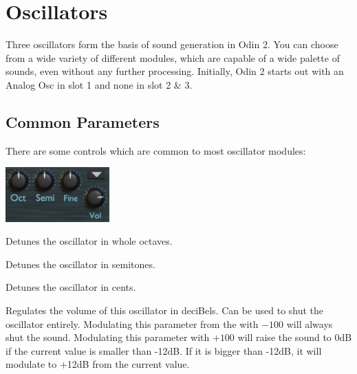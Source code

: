 \chapter{Oscillators}
\label{oscillators}
Three oscillators form the basis of sound generation in Odin 2. You can choose from a wide variety of different modules, which are capable of a wide palette of sounds, even without any further processing. Initially, Odin 2 starts out with an Analog Osc in slot 1 and none in slot 2 \& 3. 
\vspace{5mm}


\section{Common Parameters}
There are some controls which are common to most oscillator modules:

\begin{center}
    \includegraphics[width=0.3\textwidth]{graphics/osc_common.png}
\end{center}

{Detunes the oscillator in whole octaves.}

{Detunes the oscillator in semitones.}

{Detunes the oscillator in cents.}

{Regulates the volume of this oscillator in deciBels. Can be used to shut the oscillator entirely. Modulating this parameter from the \modmatrix  with $-100$ will always shut the sound. Modulating this parameter with $+100$ will raise the sound to 0dB if the current value is smaller than -12dB. If it is bigger than -12dB, it will modulate to +12dB from the current value.}

